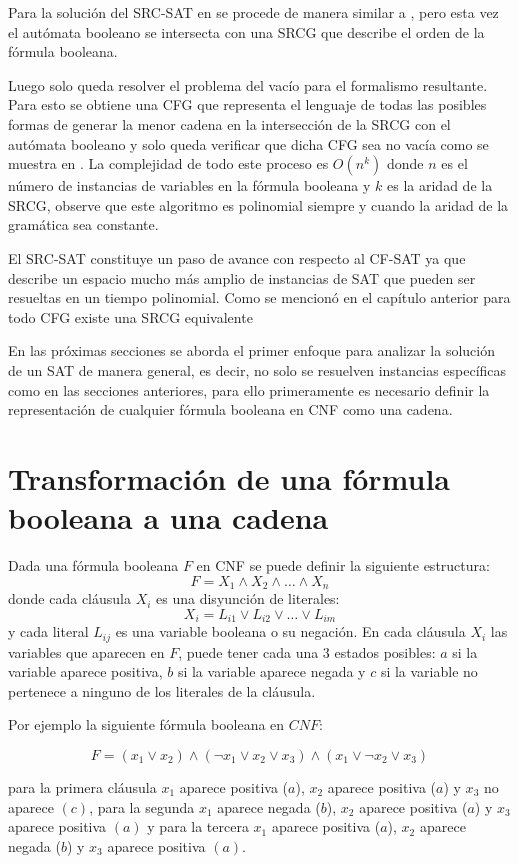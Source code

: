 Para la solución del SRC-SAT en \cite{aSRCSAT} se procede de manera similar a \cite{aCFSAT}, pero esta vez el autómata
booleano se intersecta con una SRCG que describe el orden de la fórmula booleana.

Luego solo queda resolver el problema del vacío para el formalismo resultante. Para esto se obtiene una CFG que representa
el lenguaje de todas las posibles formas de generar la menor cadena en la intersección de la SRCG con el autómata booleano
y solo queda verificar que dicha CFG sea no vacía como se muestra en \cite{aCFSAT}. La complejidad de todo este proceso es
$O(n^k)$ donde $n$ es el número de instancias de variables en la fórmula booleana y $k$ es la aridad de la SRCG, observe
que este algoritmo es polinomial siempre y cuando la aridad de la gramática sea constante.

El SRC-SAT constituye un paso de avance con respecto al CF-SAT ya que describe un espacio mucho más amplio de instancias de SAT
que pueden ser resueltas en un tiempo polinomial. Como se mencionó en el capítulo anterior para todo CFG existe una SRCG
equivalente

En las próximas secciones se aborda el primer enfoque para analizar la solución de un SAT de manera general, es decir, no solo
se resuelven instancias específicas como en las secciones anteriores, para ello primeramente es necesario definir la representación
de cualquier fórmula booleana en CNF como una cadena.
\section{Transformación de una fórmula booleana a una cadena}

Dada una fórmula booleana $F$ en CNF se puede definir la siguiente estructura:
$$F=X_1 \wedge X_2 \wedge \ldots \wedge X_n$$
donde cada cláusula $X_i$ es una disyunción de literales:
$$X_i=L_{i1} \vee L_{i2} \vee \ldots \vee L_{im}$$
y cada literal $L_{ij}$ es una variable booleana o su negación. En cada cláusula $X_i$ las variables que aparecen en $F$, puede tener cada una 3 estados posibles: $a$ si la variable aparece positiva, $b$ si la variable aparece negada y $c$ si la variable no pertenece a ninguno de los literales de la cláusula.

Por ejemplo la siguiente fórmula booleana en $CNF$:

$$F=(x_1 \vee x_2) \wedge (\neg x_1 \vee x_2 \vee x_3) \wedge (x_1 \vee \neg x_2 \vee x_3)$$

para la primera cláusula $x_1$ aparece positiva ($a$), $x_2$ aparece positiva ($a$) y $x_3$ no aparece $(c)$, para la segunda
$x_1$ aparece negada ($b$), $x_2$ aparece positiva ($a$) y $x_3$ aparece positiva $(a)$ y para la tercera
$x_1$ aparece positiva ($a$), $x_2$ aparece negada ($b$) y $x_3$ aparece positiva $(a)$.

